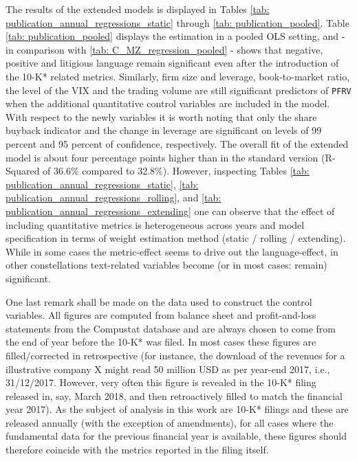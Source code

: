The results of the extended models is displayed in Tables \ref{tab: publication_annual_regressions_static} through \ref{tab: publication_pooled}. Table \ref{tab: publication_pooled} displays the estimation in a pooled OLS setting, and - in comparison with \ref{tab: C_MZ_regression_pooled} - shows that negative, positive and litigious language remain significant even after the introduction of the 10-K* related metrics. Similarly, firm size and leverage, book-to-market ratio, the level of the VIX and the trading volume are still significant predictors of \texttt{PFRV} when the additional quantitative control variables are included in the model. With respect to the newly variables it is worth noting that only the share buyback indicator and the change in leverage are significant on levels of 99 percent and 95 percent of confidence, respectively. The overall fit of the extended model is about four percentage points higher than in the standard version (R-Squared of 36.6\% compared to 32.8\%). However, inspecting Tables \ref{tab: publication_annual_regressions_static}, \ref{tab: publication_annual_regressions_rolling}, and \ref{tab: publication_annual_regressions_extending} one can observe that the effect of including quantitative metrics is heterogeneous across years and model specification in terms of weight estimation method (static / rolling / extending). While in some cases the metric-effect seems to drive out the language-effect, in other constellations text-related variables become (or in most cases: remain) significant.

One last remark shall be made on the data used to construct the control variables. All figures are computed from balance sheet and profit-and-loss statements from the Compustat database and are always chosen to come from the end of year before the 10-K* was filed. In most cases these figures are filled/corrected in retrospective (for instance, the download of the revenues for a illustrative company X might read 50 million USD as per year-end 2017, i.e., 31/12/2017. However, very often this figure is revealed in the 10-K* filing released in, say, March 2018, and then retroactively filled to match the financial year 2017). As the subject of analysis in this work are 10-K* filings and these are released annually (with the exception of amendments), for all cases where the fundamental data for the previous financial year is available, these figures should therefore coincide with the metrics reported in the filing itself. 

\clearpage
